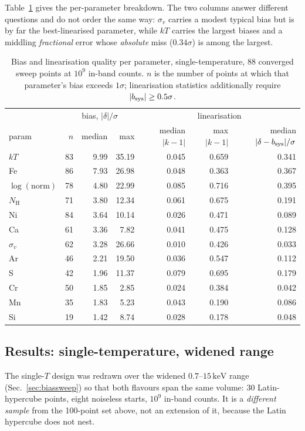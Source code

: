 \documentclass[11pt,a4paper]{article}
\newcommand{\nh}{N_{\mathrm{H}}}
\newcommand{\kev}{\,\mathrm{keV}}
\begin{document}
Table~\ref{tab:linfactor} gives the per-parameter breakdown. The two columns
answer different questions and do not order the same way: $\sigma_v$ carries a
modest typical bias but is by far the best-linearised parameter, while $kT$
carries the largest biases and a middling \emph{fractional} error whose
\emph{absolute} miss ($0.34\sigma$) is among the largest.

\begin{table}[htbp]
\centering
\caption{Bias and linearisation quality per parameter, single-temperature,
88 converged sweep points at $10^9$ in-band counts. $n$ is the number of
points at which that parameter's bias exceeds $1\sigma$; linearisation
statistics additionally require $|b_{\rm sys}|\ge0.5\sigma$.}
\label{tab:linfactor}
\begin{tabular}{lrrr|rrr}
\toprule
& \multicolumn{3}{c|}{bias, $|\delta|/\sigma$}
& \multicolumn{3}{c}{linearisation} \\
param & $n$ & median & max & median $|k{-}1|$ & max $|k{-}1|$
& median $|\delta-b_{\rm sys}|/\sigma$ \\
\midrule
$kT$      & 83 &  9.99 & 35.19 & 0.045 & 0.659 & 0.341 \\
Fe        & 86 &  7.93 & 26.98 & 0.048 & 0.363 & 0.367 \\
$\log(\text{norm})$ & 78 & 4.80 & 22.99 & 0.085 & 0.716 & 0.395 \\
$\nh$     & 71 &  3.80 & 12.34 & 0.061 & 0.675 & 0.191 \\
Ni        & 84 &  3.64 & 10.14 & 0.026 & 0.471 & 0.089 \\
Ca        & 61 &  3.36 &  7.82 & 0.041 & 0.475 & 0.128 \\
$\sigma_v$ & 62 &  3.28 & 26.66 & 0.010 & 0.426 & 0.033 \\
Ar        & 46 &  2.21 & 19.50 & 0.036 & 0.547 & 0.112 \\
S         & 42 &  1.96 & 11.37 & 0.079 & 0.695 & 0.179 \\
Cr        & 50 &  1.85 &  2.85 & 0.024 & 0.384 & 0.042 \\
Mn        & 35 &  1.83 &  5.23 & 0.043 & 0.190 & 0.086 \\
Si        & 19 &  1.42 &  8.74 & 0.028 & 0.178 & 0.048 \\
\bottomrule
\end{tabular}
\end{table}

\subsection{Results: single-temperature, widened range}\label{sec:kwide}
The single-$T$ design was redrawn over the widened $0.7$--$15\kev$ range
(Sec.~\ref{sec:biassweep}) so that both flavours span the same volume: 30
Latin-hypercube points, eight noiseless starts, $10^9$ in-band counts. It is a
\emph{different sample} from the 100-point set above, not an extension of it,
because the Latin hypercube does not nest.
\end{document}
